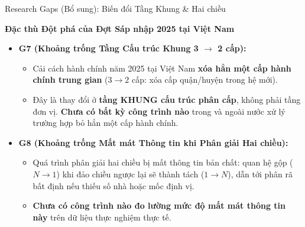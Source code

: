 \documentclass[aspectratio=169,9pt]{beamer}
\begin{document}
\begin{frame}{Research Gaps (Bổ sung): Biến đổi Tầng Khung \& Hai chiều}
  \vspace{-0.05cm}
  \centerline{\large\textbf{Đặc thù Đột phá của Đợt Sáp nhập 2025 tại Việt Nam}}
  \vspace{0.15cm}

  \begin{itemize}
    \setlength{\itemsep}{8pt}
    \item \textbf{G7 (Khoảng trống Tầng Cấu trúc Khung 3 $\to$ 2 cấp):}
      \begin{itemize}
        \setlength{\itemsep}{2.5pt}
        \item Cải cách hành chính năm 2025 tại Việt Nam \textbf{xóa hẳn một cấp hành chính trung gian} ($3 \to 2$ cấp: xóa cấp quận/huyện trong hệ mới).
        \item Đây là thay đổi ở \textbf{tầng KHUNG cấu trúc phân cấp}, không phải tầng đơn vị. \textbf{Chưa có bất kỳ công trình nào} trong và ngoài nước xử lý trường hợp bỏ hẳn một cấp hành chính.
      \end{itemize}

    \item \textbf{G8 (Khoảng trống Mất mát Thông tin khi Phân giải Hai chiều):}
      \begin{itemize}
        \setlength{\itemsep}{2.5pt}
        \item Quá trình phân giải hai chiều bị mất thông tin bản chất: quan hệ gộp ($N \to 1$) khi đảo chiều ngược lại sẽ thành tách ($1 \to N$), dẫn tới phân rã bất định nếu thiếu số nhà hoặc mốc định vị.
        \item \textbf{Chưa có công trình nào đo lường mức độ mất mát thông tin này} trên dữ liệu thực nghiệm thực tế.
      \end{itemize}
  \end{itemize}
\end{frame}
\end{document}
